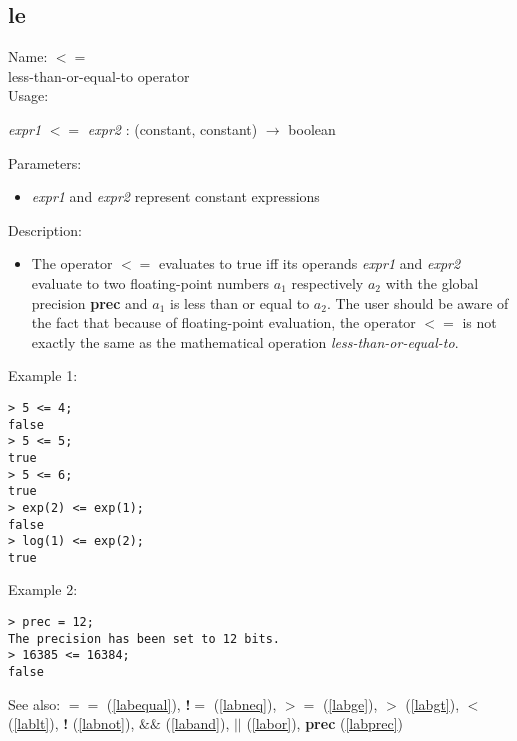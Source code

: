 \subsection{le}
\label{lable}
\noindent Name: \textbf{$<=$}\\
less-than-or-equal-to operator\\

\noindent Usage: 
\begin{center}
\emph{expr1} \textbf{$<=$} \emph{expr2} : (\textsf{constant}, \textsf{constant}) $\rightarrow$ \textsf{boolean}\\
\end{center}
Parameters: 
\begin{itemize}
\item \emph{expr1} and \emph{expr2} represent constant expressions
\end{itemize}
\noindent Description: \begin{itemize}

\item The operator \textbf{$<=$} evaluates to true iff its operands \emph{expr1} and
   \emph{expr2} evaluate to two floating-point numbers $a_1$
   respectively $a_2$ with the global precision \textbf{prec} and
   $a_1$ is less than or equal to $a_2$. The user should
   be aware of the fact that because of floating-point evaluation, the
   operator \textbf{$<=$} is not exactly the same as the mathematical
   operation \emph{less-than-or-equal-to}.
\end{itemize}
\noindent Example 1: 
\begin{center}\begin{minipage}{15cm}\begin{Verbatim}[frame=single]
> 5 <= 4;
false
> 5 <= 5;
true
> 5 <= 6;
true
> exp(2) <= exp(1);
false
> log(1) <= exp(2);
true
\end{Verbatim}
\end{minipage}\end{center}
\noindent Example 2: 
\begin{center}\begin{minipage}{15cm}\begin{Verbatim}[frame=single]
> prec = 12;
The precision has been set to 12 bits.
> 16385 <= 16384;
false
\end{Verbatim}
\end{minipage}\end{center}
See also: \textbf{$==$} (\ref{labequal}), \textbf{!$=$} (\ref{labneq}), \textbf{$>=$} (\ref{labge}), \textbf{$>$} (\ref{labgt}), \textbf{$<$} (\ref{lablt}), \textbf{!} (\ref{labnot}), \textbf{$\&\&$} (\ref{laband}), \textbf{$||$} (\ref{labor}), \textbf{prec} (\ref{labprec})
